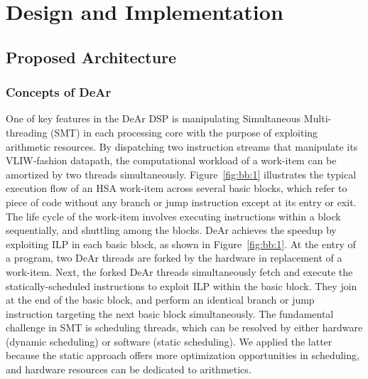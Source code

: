 \chapter{Design and Implementation}
\section{Proposed Architecture}
\subsection{Concepts of DeAr}
\indent 
One of key features in the DeAr DSP is manipulating Simultaneous Multi-threading (SMT) in each processing core with the purpose of exploiting arithmetic resources.
By dispatching two instruction streams that manipulate its VLIW-fashion datapath, 
the computational workload of a work-item can be amortized by two threads simultaneously.
Figure~\ref{fig:bb:1} illustrates the typical execution flow of an HSA work-item across several basic blocks, 
which refer to piece of code without any branch or jump instruction except at its entry or exit.
The life cycle of the work-item involves executing instructions within a block sequentially, and shuttling among the blocks.
DeAr achieves the speedup by exploiting ILP in each basic block, as shown in Figure~\ref{fig:bb:1}. 
At the entry of a program, two DeAr threads are forked by the hardware in replacement of a work-item.
Next, the forked DeAr threads simultaneously fetch and execute the statically-scheduled instructions to exploit ILP within the basic block.
They join at the end of the basic block, and perform an identical branch or jump instruction targeting the next basic block simultaneously.
The fundamental challenge in SMT is scheduling threads, 
which can be resolved by either hardware (dynamic scheduling) or software (static scheduling).
We applied the latter because the static approach offers more optimization opportunities in scheduling, 
and hardware resources can be dedicated to arithmetics.
\vspace{\textfig}
